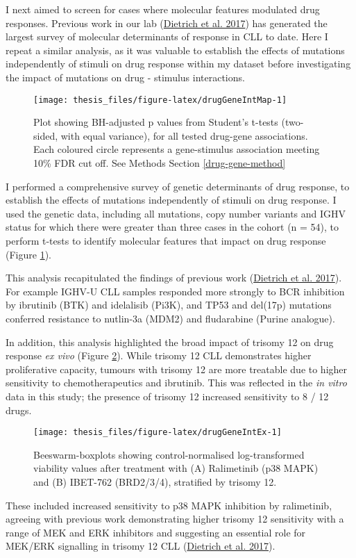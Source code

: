 \documentclass[11pt, a4paper, twosided]{book}
\begin{document}
I next aimed to screen for cases where molecular features modulated drug responses. Previous work in our lab (\protect\hyperlink{ref-JCIpaper}{Dietrich et al. 2017}) has generated the largest survey of molecular determinants of response in CLL to date. Here I repeat a similar analysis, as it was valuable to establish the effects of mutations independently of stimuli on drug response within my dataset before investigating the impact of mutations on drug - stimulus interactions.


\begin{figure}

{\centering \texttt{[image: thesis\_files/figure-latex/drugGeneIntMap-1]} 

}

\caption{Plot showing BH-adjusted p values from Student's t-tests (two-sided, with equal variance), for all tested drug-gene associations. Each coloured circle represents a gene-stimulus association meeting 10\% FDR cut off. See Methods Section \ref{drug-gene-method}}\label{fig:drugGeneIntMap}
\end{figure}
I performed a comprehensive survey of genetic determinants of drug response, to establish the effects of mutations independently of stimuli on drug response. I used the genetic data, including all mutations, copy number variants and IGHV status for which there were greater than three cases in the cohort (n = 54), to perform t-tests to identify molecular features that impact on drug response (Figure \ref{fig:drugGeneIntMap}).

This analysis recapitulated the findings of previous work (\protect\hyperlink{ref-JCIpaper}{Dietrich et al. 2017}). For example IGHV-U CLL samples responded more strongly to BCR inhibition by ibrutinib (BTK) and idelalisib (Pi3K), and TP53 and del(17p) mutations conferred resistance to nutlin-3a (MDM2) and fludarabine (Purine analogue).

In addition, this analysis highlighted the broad impact of trisomy 12 on drug response \emph{ex vivo} (Figure \ref{fig:drugGeneIntEx}). While trisomy 12 CLL demonstrates higher proliferative capacity, tumours with trisomy 12 are more treatable due to higher sensitivity to chemotherapeutics and ibrutinib. This was reflected in the \emph{in vitro} data in this study; the presence of trisomy 12 increased sensitivity to 8 / 12 drugs.


\begin{figure}

{\centering \texttt{[image: thesis\_files/figure-latex/drugGeneIntEx-1]} 

}

\caption{Beeswarm-boxplots showing control-normalised log-transformed viability values after treatment with (A) Ralimetinib (p38 MAPK) and (B) IBET-762 (BRD2/3/4), stratified by trisomy 12.}\label{fig:drugGeneIntEx}
\end{figure}
These included increased sensitivity to p38 MAPK inhibition by ralimetinib, agreeing with previous work demonstrating higher trisomy 12 sensitivity with a range of MEK and ERK inhibitors and suggesting an essential role for MEK/ERK signalling in trisomy 12 CLL (\protect\hyperlink{ref-JCIpaper}{Dietrich et al. 2017}).
\end{document}
